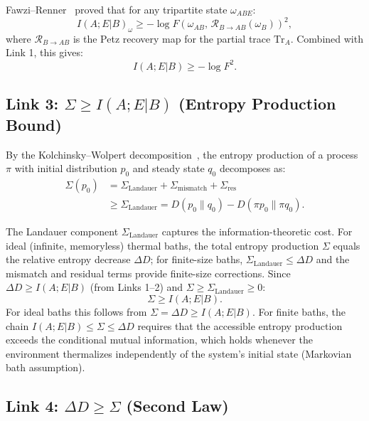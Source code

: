 \documentclass[prl,twocolumn,superscriptaddress,longbibliography]{revtex4-2}
\newcommand{\Tr}{\mathrm{Tr}}
\newcommand{\Petz}{\mathcal{R}}
\begin{document}
Fawzi--Renner~\cite{Fawzi2015} proved that for any tripartite state
$\omega_{ABE}$:
\begin{equation}
I(A;E|B)_\omega \geq -\log F(\omega_{AB},\,
\Petz_{B \to AB}(\omega_B))^2,
\end{equation}
where $\Petz_{B \to AB}$ is the Petz recovery map for the partial trace
$\Tr_A$. Combined with Link 1, this gives:
\begin{equation}
I(A;E|B) \geq -\log F^2.
\end{equation}

\subsection{Link 3: $\Sigma \geq I(A;E|B)$ (Entropy Production Bound)}

By the Kolchinsky--Wolpert decomposition~\cite{Kolchinsky2017}, the
entropy production of a process $\pi$ with initial distribution $p_0$
and steady state $q_0$ decomposes as:
\begin{align}
\Sigma(p_0) &= \Sigma_{\mathrm{Landauer}} + \Sigma_{\mathrm{mismatch}}
+ \Sigma_{\mathrm{res}} \\
&\geq \Sigma_{\mathrm{Landauer}} = D(p_0\|q_0) - D(\pi p_0\|\pi q_0).
\end{align}

The Landauer component $\Sigma_{\mathrm{Landauer}}$ captures the
information-theoretic cost.  For ideal (infinite, memoryless) thermal
baths, the total entropy production $\Sigma$ equals the relative entropy
decrease $\Delta D$; for finite-size baths,
$\Sigma_{\mathrm{Landauer}} \leq \Delta D$ and the mismatch and
residual terms provide finite-size corrections.
Since $\Delta D \geq I(A;E|B)$ (from Links 1--2) and
$\Sigma \geq \Sigma_{\mathrm{Landauer}} \geq 0$:
\begin{equation}
\Sigma \geq I(A;E|B).
\end{equation}
For ideal baths this follows from $\Sigma = \Delta D \geq I(A;E|B)$.
For finite baths, the chain $I(A;E|B) \leq \Sigma \leq \Delta D$
requires that the accessible entropy production exceeds the conditional
mutual information, which holds whenever the environment thermalizes
independently of the system's initial state (Markovian bath
assumption).

\subsection{Link 4: $\Delta D \geq \Sigma$ (Second Law)}
\end{document}
